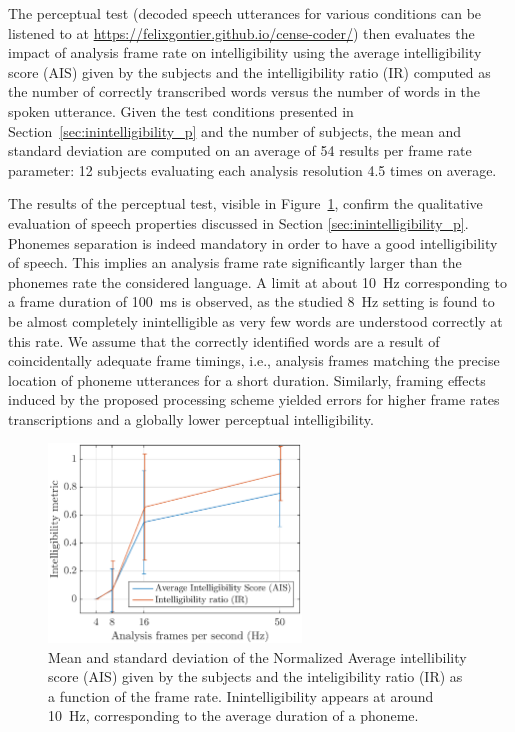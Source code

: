 \documentclass[sensors,article,accept,moreauthors,pdftex,10pt,a4paper]{mdpi}
\begin{document}
The perceptual test ({{decoded speech utterances for various conditions can be listened to at} \url{https://felixgontier.github.io/cense-coder/}}) then evaluates the impact of analysis frame rate on intelligibility using the average intelligibility score (AIS) given by the subjects and the intelligibility ratio (IR) computed as the number of correctly transcribed words versus the number of words in the spoken utterance. Given the test conditions presented in Section~\ref{sec:inintelligibility_p} and the number of subjects, the mean and standard deviation are computed on an average of 54 results per frame rate parameter: 12 subjects evaluating each analysis resolution 4.5 times on average.

The results of the perceptual test, visible in Figure~\ref{fig:subj_int}, confirm the qualitative evaluation of speech properties discussed in Section \ref{sec:inintelligibility_p}. Phonemes separation is indeed mandatory in order to have a good intelligibility of speech. This implies an analysis frame rate significantly larger than the phonemes rate the considered language. A limit at about 10~Hz corresponding to a frame duration of 100~ms is observed, as the studied 8~Hz setting is found to be almost completely inintelligible as very few words are understood correctly at this rate. We assume that the correctly identified words are a result of coincidentally adequate frame timings, i.e., analysis frames matching the precise location of phoneme utterances for a short duration. Similarly, framing effects induced by the proposed processing scheme yielded errors for higher frame rates transcriptions and a globally lower perceptual intelligibility.
\vspace{-6pt} 
\begin{figure}[H]
	\centering
		\includegraphics[width=0.6\textwidth]{figures/subj_int.eps}
	\caption{Mean and standard deviation of the Normalized Average intellibility score (AIS) given by the subjects and the inteligibility ratio (IR) as a function of the frame rate. Inintelligibility appears at around 10~Hz, corresponding to the average duration of a phoneme.}
	\label{fig:subj_int}
\end{figure}
\end{document}
